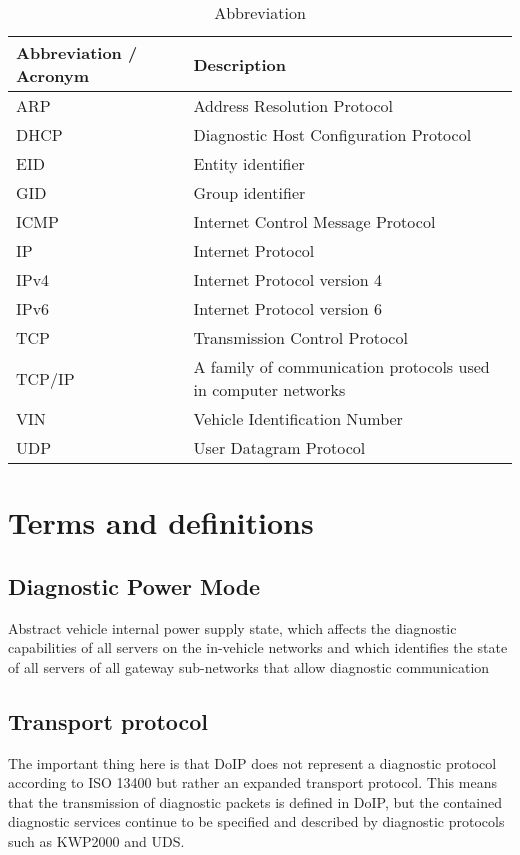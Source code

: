 \begin{table}[htbp]
  \centering
  \caption{Abbreviation}
  \label{tab:abbreviations}
  \begin{tabular}{|m{3cm}|m{7cm}|}
    \hline
    \textbf{Abbreviation / Acronym} & \textbf{Description} \\
    \hline
    ARP & Address Resolution Protocol \\
    \hline
    DHCP & Diagnostic Host Configuration Protocol \\
    \hline
    EID & Entity identifier \\
    \hline
    GID & Group identifier \\
    \hline
    ICMP & Internet Control Message Protocol \\
    \hline
    IP & Internet Protocol \\
    \hline
    IPv4 & Internet Protocol version 4 \\
    \hline
    IPv6 & Internet Protocol version 6 \\
    \hline
    TCP & Transmission Control Protocol \\
    \hline
    TCP/IP & A family of communication protocols used in computer networks \\
    \hline
    VIN & Vehicle Identification Number \\
    \hline
    UDP & User Datagram Protocol \\
    \hline
  \end{tabular}
\end{table}



\section{Terms and definitions}

\subsection{Diagnostic Power Mode}
Abstract vehicle internal power supply state, which affects the diagnostic capabilities of all servers on the 
in-vehicle networks and which identifies the state of all servers of all gateway sub-networks that allow diagnostic 
communication

\subsection{Transport protocol}
The important thing here is that DoIP does not represent a diagnostic protocol according to ISO 
13400 but rather an expanded transport protocol. This means that the transmission of diagnostic packets is defined 
in DoIP, but the contained diagnostic services continue to be specified and described by diagnostic protocols 
such as KWP2000 and UDS.

